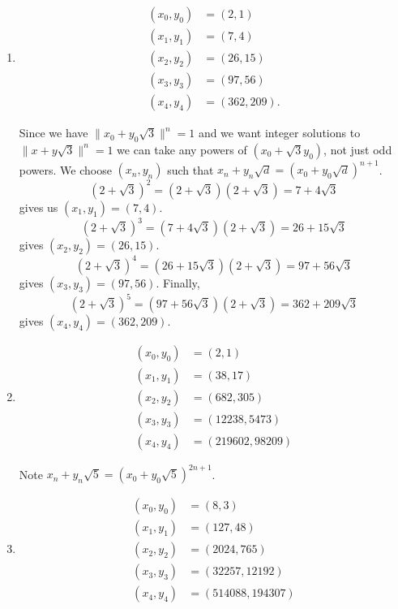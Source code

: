 \documentclass[12 pt, letterpaper]{hmcpset}
\begin{document}
\begin{solution}
\begin{enumerate}
			Similarly
			\[
				(1 + \sqrt{2})^{5} = (7 + 5 \sqrt{2})(3 + 2 \sqrt{2}) = 41 + 29 \sqrt{2}
			\]
			gives us $(x_{2}, y_{2}) = (41, 29)$,
			\[
				(1 + \sqrt{2})^{7} = (41 + 29 \sqrt{2})(3 + 2 \sqrt{2}) = 239 + 169 \sqrt{2}
			\]
			gives us $(x_{3}, y_{3}) = (239, 169)$, and
			\[
				(1 + \sqrt{2})^{9} = (239 + 169 \sqrt{2}) (3 + 2 \sqrt{2}) = 1393 + 985 \sqrt{2}
			\]
			gives us $(x_{4}, y_{4}) = (1393, 985)$
		\item
			\[
				\boxed{
					\begin{split}
						(x_{0}, y_{0}) & = (2, 1) \\
						(x_{1}, y_{1}) & = (7, 4) \\
						(x_{2}, y_{2}) & = (26, 15) \\
						(x_{3}, y_{3}) & = (97, 56) \\
						(x_{4}, y_{4}) & = (362, 209).
					\end{split}
				}
			\]

			Since we have $\lVert x_{0} + y_{0} \sqrt{3} \rVert^{n} = 1$ and we want integer solutions to $\lVert x + y \sqrt{3} \rVert^{n} = 1$ we can take any powers of $(x_{0} + \sqrt{3} y_{0})$, not just odd powers. We choose $(x_{n}, y_{n})$ such that $x_{n} + y_{n} \sqrt{d} = (x_{0} + y_{0} \sqrt{d})^{n + 1}$.
			\[
				(2 + \sqrt{3})^{2} = (2 + \sqrt{3})(2 + \sqrt{3}) = 7 + 4 \sqrt{3}
			\]
			gives us $(x_{1}, y_{1}) = (7, 4)$.
			\[
				(2 + \sqrt{3})^{3} = (7 + 4 \sqrt{3})(2 + \sqrt{3}) = 26 + 15 \sqrt{3}
			\]
			gives $(x_{2}, y_{2}) = (26, 15)$.
			\[
				(2 + \sqrt{3})^{4} = (26 + 15 \sqrt{3})(2 + \sqrt{3}) = 97 + 56 \sqrt{3}
			\]
			gives $(x_{3}, y_{3}) = (97, 56)$. Finally,
			\[
				(2 + \sqrt{3})^{5} = (97 + 56 \sqrt{3})(2 + \sqrt{3}) = 362 + 209 \sqrt{3}
			\]
			gives $(x_{4}, y_{4}) = (362, 209)$.
		\item
			\[
				\boxed{
					\begin{split}
						(x_{0}, y_{0}) & = (2, 1) \\
						(x_{1}, y_{1}) & = (38, 17) \\
						(x_{2}, y_{2}) & = (682, 305) \\
						(x_{3}, y_{3}) & = (12238, 5473)  \\
						(x_{4}, y_{4}) & = (219602, 98209)
					\end{split}
				}
			\]

			Note $x_{n} + y_{n} \sqrt{5} = (x_{0} + y_{0} \sqrt{5})^{2n + 1}$.
		\item
			\[
				\boxed{
					\begin{split}
						(x_{0}, y_{0}) & = (8, 3) \\
						(x_{1}, y_{1}) & = (127, 48) \\
						(x_{2}, y_{2}) & = (2024, 765) \\
						(x_{3}, y_{3}) & = (32257, 12192) \\
						(x_{4}, y_{4}) & = (514088, 194307)
					\end{split}
				}
			\]


\end{enumerate}
\end{solution}
\end{document}
